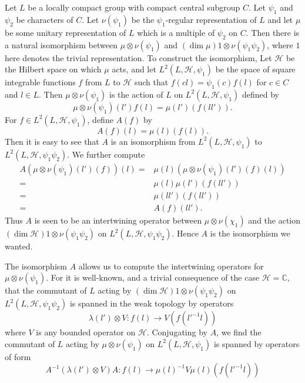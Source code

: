 \documentclass[12pt]{amsart}
\def\chh{{\mathcal{H}}}
\def\bC{{\mathbb{C}}}
\begin{document}
Let $L$ be a locally compact group with compact central subgroup $C$. 
Let $\psi_1$ and $\psi_2$ be characters of $C$. Let $\nu(\psi_1)$ 
be the $\psi_1$-regular representation of $L$ and let $\mu$ be some 
unitary representation of $L$ which is a multiple of $\psi_2$ on $C$. 
Then there is a natural isomorphism between 
$\mu\otimes \nu(\psi_1)$ and $(\dim \mu) 1\otimes \nu(\psi_1\psi_2)$, 
where $1$ here denotes the trivial representation. To construct the isomorphism,
Let $\chh$ be the Hilbert space on which $\mu$ acts, 
and let $L^2(L,\chh,\psi_1)$ be the space of 
square integrable functions $f$ from $L$ to $\chh$ such that 
$f(cl) = \psi_1(c)f(l)$ for $c\in C$ and $l\in L$. 
Then $\mu\otimes \nu(\psi_1)$ is the action of $L$ on $L^2(L,\chh,\psi_1)$
defined by 
\[
\mu \otimes \nu(\psi_1)(l')f(l) = \mu(l')(f(ll')).
\]
For $f\in L^2(L,\chh,\psi_1)$, define $A(f)$ by 
\[
A(f)(l) = \mu(l)(f(l)).
\]
Then it is easy to see that $A$ is an isomorphism from $L^2(L,\chh, \psi_1)$
to $L^2(L, \chh, \psi_1\psi_2)$. We further compute 
\[
\begin{split}
A(\mu\otimes \nu(\psi_1)(l')(f))(l) 
=& \mu(l)(\mu\otimes \nu(\psi_1)(l')(f)(l))\\
=& \mu(l)\mu(l')(f(ll'))\\
=&\mu(ll')(f(ll'))\\
=&A(f)(ll').
\end{split}
\]
Thus $A$ is seen to be an intertwining operator between $\mu\otimes \nu(\chi_1)$
and the action $(\dim \chh)1\otimes \nu(\psi_1\psi_2)$ on
$L^2(L, \chh, \psi_1\psi_2)$. Hence $A$ is the isomorphism we wanted. 

The isomorphism $A$ allows us to compute the intertwining operators 
for $\mu\otimes \nu(\psi_1)$. For it is well-known, and a trivial consequence
of the case $\chh=\bC$, that the commutant of $L$ acting by 
$(\dim \chh)1\otimes \nu(\psi_1\psi_2)$ on $L^2(L, \chh, \psi_1\psi_2)$ 
is spanned in the weak topology by operators 
\[
\lambda(l')\otimes V\colon f(l)\to V(f({l'}^{-1}l))
\]
where $V$ is any bounded operator on $\chh$. Conjugating by $A$, we 
find the commutant of $L$ acting by $\mu\otimes \nu(\psi_1)$ 
on $L^2(L, \chh,\psi_1)$ is spanned by operators of form 
\begin{equation}\label{eq:27}
A^{-1}(\lambda(l')\otimes V)A\colon f(l) \to \mu(l)^{-1}V \mu(l)(f({l'}^{-1}l))
\end{equation}
\end{document}
